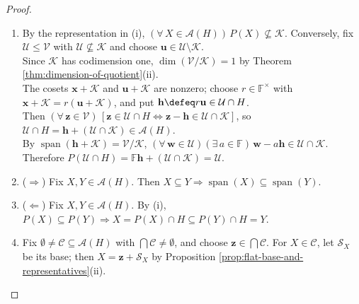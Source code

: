 \begin{theorem}
\begin{proof}
\begin{enumerate}[label=(\roman*)]
Together with $X\subseteq\mathbb{F}\mathbf{u}+\mathcal{S}$, this proves $P(X)=\mathbb{F}\mathbf{u}\oplus\mathcal{S}$; the sum is direct because $\mathcal{S}\leq\mathcal{K}$ and $\mathbf{u}\notin\mathcal{K}$.\\
If $\mathbf{z}\in P(X)\cap H$, write $\mathbf{z}=r\mathbf{u}+\mathbf{s}=\mathbf{u}+\mathbf{k}$ with $(r,\mathbf{s},\mathbf{k})\in\mathbb{F}\times\mathcal{S}\times\mathcal{K}$.\\
Then $(1-r)\mathbf{u}=\mathbf{s}-\mathbf{k}\in\mathcal{K}$, whence $r=1$ and $\mathbf{z}\in X$. Since $X\subseteq P(X)\cap H$, $P(X)\cap H=X$.\\
Therefore $(\forall\,X,Y\in\mathcal{A}(H))\,[P(X)=P(Y)\Rightarrow X=P(X)\cap H=P(Y)\cap H=Y]$, and $(\forall\,\mathcal{U}\in\operatorname{im}P)\,P^{-1}(\mathcal{U})=\mathcal{U}\cap H$.
\item[$(ii)$] By the representation in (i), $(\forall\,X\in\mathcal{A}(H))\,P(X)\nsubseteq\mathcal{K}$. Conversely, fix $\mathcal{U}\leq\mathcal{V}$ with $\mathcal{U}\nsubseteq\mathcal{K}$ and choose $\mathbf{u}\in\mathcal{U}\setminus\mathcal{K}$.\\
Since $\mathcal{K}$ has codimension one, $\dim(\mathcal{V}/\mathcal{K})=1$ by Theorem \ref{thm:dimension-of-quotient}(ii).\\
The cosets $\mathbf{x}+\mathcal{K}$ and $\mathbf{u}+\mathcal{K}$ are nonzero; choose $r\in\mathbb{F}^{\times}$ with $\mathbf{x}+\mathcal{K}=r(\mathbf{u}+\mathcal{K})$, and put $\mathbf{h}\defeq r\mathbf{u}\in\mathcal{U}\cap H$.\\
Then $(\forall\,\mathbf{z}\in\mathcal{V})\,[\mathbf{z}\in\mathcal{U}\cap H\iff\mathbf{z}-\mathbf{h}\in\mathcal{U}\cap\mathcal{K}]$, so $\mathcal{U}\cap H=\mathbf{h}+(\mathcal{U}\cap\mathcal{K})\in\mathcal{A}(H)$.\\
By $\operatorname{span}(\mathbf{h}+\mathcal{K})=\mathcal{V}/\mathcal{K}$, $(\forall\,\mathbf{w}\in\mathcal{U})(\exists\,a\in\mathbb{F})\,\mathbf{w}-a\mathbf{h}\in\mathcal{U}\cap\mathcal{K}$. Therefore $P(\mathcal{U}\cap H)=\mathbb{F}\mathbf{h}+(\mathcal{U}\cap\mathcal{K})=\mathcal{U}$.
\item[$(iii)$] ($\Rightarrow$) Fix $X,Y\in\mathcal{A}(H)$. Then $X\subseteq Y\Rightarrow\operatorname{span}(X)\subseteq\operatorname{span}(Y)$.
\item[$(iii)$] ($\Leftarrow$) Fix $X,Y\in\mathcal{A}(H)$. By (i), $P(X)\subseteq P(Y)\Rightarrow X=P(X)\cap H\subseteq P(Y)\cap H=Y$.
\item[$(iv)$] Fix $\emptyset\neq\mathcal{C}\subseteq\mathcal{A}(H)$ with $\bigcap\mathcal{C}\neq\emptyset$, and choose $\mathbf{z}\in\bigcap\mathcal{C}$. For $X\in\mathcal{C}$, let $\mathcal{S}_X$ be its base; then $X=\mathbf{z}+\mathcal{S}_X$ by Proposition \ref{prop:flat-base-and-representatives}(ii).\\

\end{enumerate}
\end{proof}
\end{theorem}
